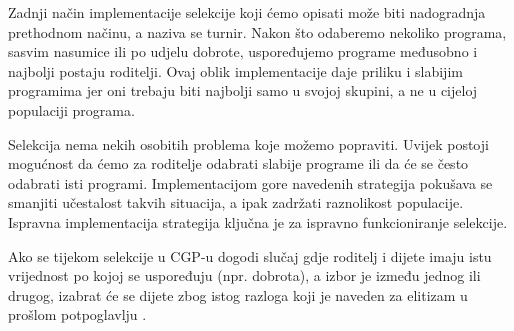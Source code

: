   \par
  Zadnji način implementacije selekcije koji ćemo opisati može biti nadogradnja prethodnom načinu, a naziva se turnir. Nakon što odaberemo nekoliko programa, sasvim nasumice ili po udjelu dobrote, uspoređujemo programe međusobno i najbolji postaju roditelji. Ovaj oblik implementacije daje priliku i slabijim programima jer oni trebaju biti najbolji samo u svojoj skupini, a ne u cijeloj populaciji programa.
  \par
  Selekcija nema nekih osobitih problema koje možemo popraviti. Uvijek postoji mogućnost da ćemo za roditelje odabrati slabije programe ili da će se često odabrati isti programi. Implementacijom gore navedenih strategija pokušava se smanjiti učestalost takvih situacija, a ipak zadržati raznolikost populacije. Ispravna implementacija strategija ključna je za ispravno funkcioniranje selekcije.
  \par
  Ako se tijekom selekcije u CGP-u dogodi slučaj gdje roditelj i dijete imaju istu vrijednost po kojoj se uspoređuju (npr. dobrota), a izbor je između jednog ili drugog, izabrat će se dijete zbog istog razloga koji je naveden za elitizam u prošlom potpoglavlju \cite{CGPbook}\cite{CGPpresentation}. 